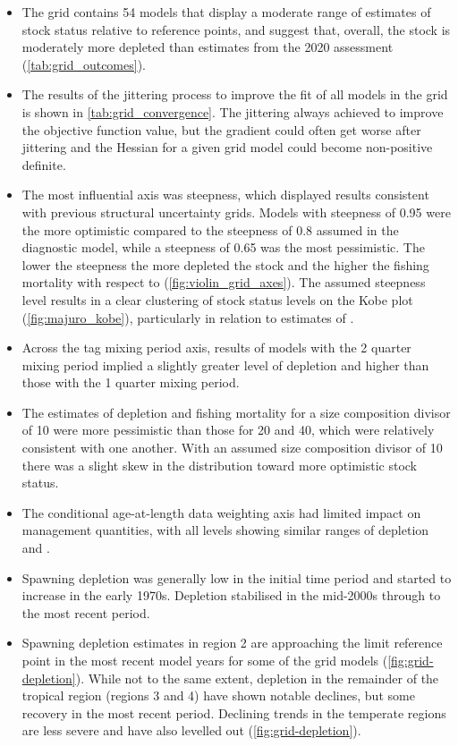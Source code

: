 \begin{itemize}
  \item The grid contains 54 models that display a moderate range of estimates of stock status relative to reference points, and suggest that, overall, the stock is moderately more depleted than estimates from the 2020 assessment (\autoref{tab:grid_outcomes}).
  \item The results of the jittering process to improve the fit of all models in the grid is shown in \autoref{tab:grid_convergence}. The jittering always achieved to improve the objective function value, but the gradient could often get worse after jittering and the Hessian for a given grid model could become non-positive definite.
  \item The most influential axis was steepness, which displayed results consistent with previous structural uncertainty grids. Models with steepness of 0.95 were the more optimistic compared to the steepness of 0.8 assumed in the diagnostic model, while a steepness of 0.65 was the most pessimistic. The lower the steepness the more depleted the stock and the higher the fishing mortality with respect to \fmsy (\autoref{fig:violin_grid_axes}). The assumed steepness level results in a clear clustering of stock status levels on the Kobe plot (\autoref{fig:majuro_kobe}), particularly in relation to estimates of \sbmsy.
  \item Across the tag mixing period axis, results of models with the 2 quarter mixing period implied a slightly greater level of depletion and higher \ffmsy than those with the 1 quarter mixing period.
  \item The estimates of depletion and fishing mortality for a size composition divisor of 10 were more pessimistic than those for 20 and 40, which were relatively consistent with one another. With an assumed size composition divisor of 10 there was a slight skew in the distribution toward more optimistic stock status.
  \item The conditional age-at-length data weighting axis had limited impact on management quantities, with all levels showing similar ranges of depletion and \ffmsy.
  \item Spawning depletion was generally low in the initial time period and started to increase in the early 1970s. Depletion stabilised in the mid-2000s through to the most recent period.
  \item Spawning depletion estimates in region 2 are approaching the limit reference point \lrp in the most recent model years for some of the grid models (\autoref{fig:grid-depletion}). While not to the same extent, depletion in the remainder of the tropical region (regions 3 and 4) have shown notable declines, but some recovery in the most recent period. Declining trends in the temperate regions are less severe and have also levelled out (\autoref{fig:grid-depletion}).

\end{itemize}
